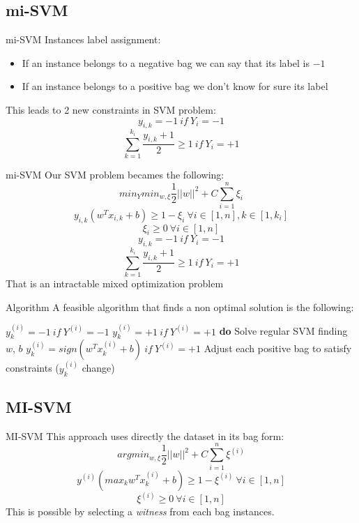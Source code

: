 \subsection{mi-SVM}
\begin{frame}{mi-SVM}
	Instances label assignment:
	\begin{itemize}\setlength\itemsep{1em}
		\item If an instance belongs to a negative bag we can say that its label is $-1$
		\item If an instance belongs to a positive bag we don't know for sure its label
	\end{itemize}
	\vspace{12px}
	This leads to 2 new constraints in SVM problem:
	$$y_{i,k} = -1 \ if \ Y_i = -1$$
	$$\sum_{k = 1}^{k_i}\frac{y_{i,k} + 1}{2} \geq 1 \ if \ Y_i = +1$$
\end{frame}

\begin{frame}{mi-SVM}
	Our SVM problem becames the following:
	$$min_Y min_{w, \xi} \frac{1}{2} ||w||^2 + C \sum_{i = 1}^{n}\xi_i$$
	$$y_{i,k} (w^T x_{i,k} + b) \geq 1 - \xi_i \ \forall i \in [1, n], k \in [1, k_i]$$
	$$\xi_i \geq 0 \ \forall i \in [1, n]$$
	$$y_{i,k} = -1 \ if \ Y_i = -1$$
	$$\sum_{k = 1}^{k_i}\frac{y_{i,k} + 1}{2} \geq 1 \ if \ Y_i = +1$$
	That is an intractable mixed optimization problem
\end{frame}

\begin{frame}{Algorithm}
	A feasible algorithm that finds a non optimal solution is the following:
	
	\begin{codebox}
		\li $y_k^{(i)} = -1 \ if \ Y^{(i)} = -1$
		\li $y_k^{(i)} = +1 \ if \ Y^{(i)} = +1$
		\li \textbf{do} \Do
		\li Solve regular SVM finding $w$, $b$
		\li $y_k^{(i)} = sign(w^T x_k^{(i)} + b) \ if \ Y^{(i)} = +1$
		\li Adjust each positive bag to satisfy constraints \End
		\li \While($y_k^{(i)}$ change)
		
	\end{codebox}
	
\end{frame}

\subsection{MI-SVM}
\begin{frame}{MI-SVM}
	This approach uses directly the dataset in its bag form:
	$$arg min_{w, \xi} \frac{1}{2} ||w||^2 + C \sum_{i = 1}^{n}\xi^{(i)}$$
	$$y^{(i)} (max_k w^T x_k^{(i)} + b) \geq 1 - \xi^{(i)} \ \forall i \in [1, n]$$
	$$\xi^{(i)} \geq 0 \ \forall i \in [1, n]$$
	This is possible by selecting a \textit{witness} from each bag instances.
\end{frame}


